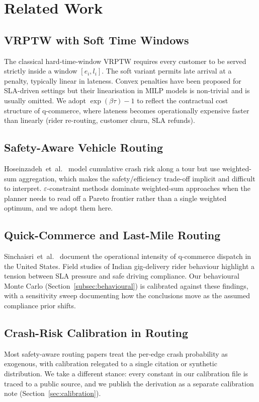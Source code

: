 \documentclass{ieeeaccess}
\begin{document}
\section{Related Work}
\label{sec:related}

\subsection{VRPTW with Soft Time Windows}
The classical hard-time-window VRPTW \cite{solomon1987} requires every
customer to be served strictly inside a window $[e_i, l_i]$. The soft
variant \cite{koskosidis1992,fu2008} permits late arrival at a
penalty, typically linear in lateness. Convex penalties have been
proposed for SLA-driven settings \cite{taillard1997} but their
linearisation in MILP models is non-trivial and is usually omitted.
We adopt $\exp(\beta \tau) - 1$ to reflect the contractual cost
structure of q-commerce, where lateness becomes operationally
expensive faster than linearly (rider re-routing, customer churn,
SLA refunds).

\subsection{Safety-Aware Vehicle Routing}
Hoseinzadeh~et~al.\ \cite{hoseinzadeh2020} model cumulative crash risk
along a tour but use weighted-sum aggregation, which makes the
safety/efficiency trade-off implicit and difficult to interpret.
$\varepsilon$-constraint methods \cite{salmon2023,ehrgott2005} dominate
weighted-sum approaches when the planner needs to read off a Pareto
frontier rather than a single weighted optimum, and we adopt them
here.

\subsection{Quick-Commerce and Last-Mile Routing}
Sinchaisri~et~al.\ \cite{sinchaisri2023} document the operational
intensity of q-commerce dispatch in the United States. Field studies
of Indian gig-delivery rider behaviour
\cite{das2020,zografos2004} highlight a tension between SLA pressure
and safe driving compliance. Our behavioural Monte Carlo
(Section~\ref{subsec:behavioural}) is calibrated against these
findings, with a sensitivity sweep documenting how the conclusions
move as the assumed compliance prior shifts.

\subsection{Crash-Risk Calibration in Routing}
Most safety-aware routing papers treat the per-edge crash probability
as exogenous, with calibration relegated to a single citation or
synthetic distribution. We take a different stance: every constant
in our calibration file is traced to a public source, and we publish
the derivation as a separate calibration note (Section~\ref{sec:calibration}).
\end{document}
